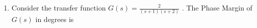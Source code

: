 \documentclass[journal,12pt,twocolumn]{IEEEtran}
\renewcommand\thesection{\arabic{section}}
\begin{document}
\begin{enumerate}[label=\arabic*.,ref=\thesection.\theenumi]
%
%
% 
%
%
%
%
%
%
%
%
%
\item
Consider the transfer function $G(s)=\frac{2}{(s+1)(s+2)}$ . The Phase Margin of $G(s)$ in degrees is
%
%
%

\end{enumerate}
\end{document}
